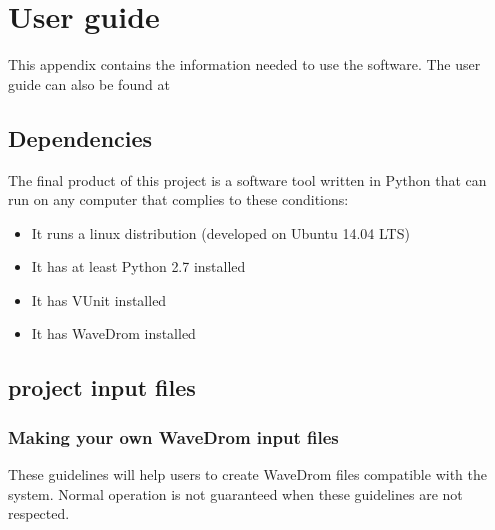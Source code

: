 \chapter{User guide}\label{user_guide}
This appendix contains the information needed to use the software. The user guide can also be found at \cite{user_guide}

\section{Dependencies}
The final product of this project is a software tool written in Python that can run on any computer that complies to these conditions:
\begin{itemize}
	\item It runs a linux distribution (developed on Ubuntu 14.04 LTS)
	\item It has at least Python \cite{python} 2.7 installed
	\item It has VUnit \cite{vunit_doc} installed
	\item It has WaveDrom \cite{wavedrom} installed
\end{itemize}\newpage
\section{project input files}
\subsection{Making your own WaveDrom input files}
These guidelines will help users to create WaveDrom files compatible with the system. Normal operation is not guaranteed when these guidelines are not respected.
